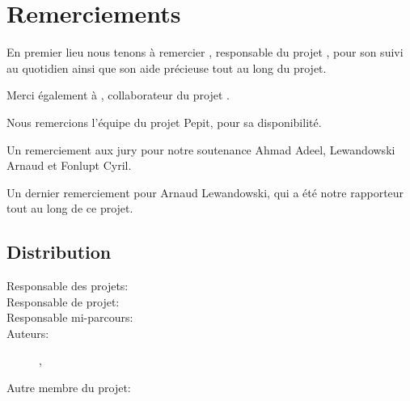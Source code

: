 \documentclass[french]{report}
\begin{document}


\pagestyle{fancyplain}
\renewcommand{\chaptermark}[1]{\markboth{\chaptername\ \thechapter. #1}{}}
\renewcommand{\sectionmark}[1]{\markright{\thesection. #1}}
\lhead[]{\fancyplain{}{\bfseries\leftmark}}
\rhead[]{\fancyplain{}{\bfseries\thepage}}
\cfoot{}
% 
%
\chapter*{Remerciements}
En premier lieu nous tenons à remercier \civiliteResponsableProet{} \responsableProjet{}, responsable du projet \pepitMobil, pour son suivi au quotidien ainsi que son aide précieuse tout au long du projet.

Merci également à \etudiantSL, collaborateur du projet \pepitMobil.

Nous remercions l'équipe du projet Pepit, pour sa disponibilité.

Un remerciement aux jury pour notre soutenance Ahmad Adeel, Lewandowski Arnaud et Fonlupt Cyril.

Un dernier remerciement pour Arnaud Lewandowski, qui a été notre rapporteur tout au long de ce projet.


\section*{Distribution}
\begin{description}
\item [Responsable des projets:] \responsableDesProjets
\item [Responsable de projet:] \responsableProjet
\item [Responsable mi-parcours:] \responsableMiParcours
\item [Auteurs:] \etudiantJP, \etudiantRD
\item [Autre membre du projet:] \etudiantSL
\end{description}


\tableofcontents


\end{document}
